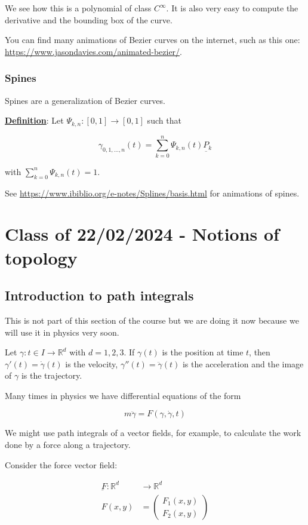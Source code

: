 \documentclass[10pt]{extarticle}
\newcommand{\R}{\mathbb{R}}
\newcommand{\munderbar}[1]{\underbar{\ensuremath{#1}}}
\begin{document}
We see how this is a polynomial of class $C^\infty$. It is also very easy to compute the derivative and the bounding box of the curve.

You can find many animations of Bezier curves on the internet, such as this one: \url{https://www.jasondavies.com/animated-bezier/}.

\subsubsection{Spines}

Spines are a generalization of Bezier curves.

\textbf{\underline{Definition}}: Let $\Psi_{k, n}: [0, 1]\to [0, 1]$ such that

$$
    \gamma_{0,1, \ldots, n}(t) = \sum_{k=0}^n \Psi_{k, n}(t) \munderbar{P_k}
$$

with $\sum_{k=0}^n \Psi_{k, n}(t) = 1$.

See \url{https://www.ibiblio.org/e-notes/Splines/basis.html} for animations of spines.

\section{Class of 22/02/2024 - Notions of topology}


\subsection{Introduction to path integrals}

This is not part of this section of the course but we are doing it now because we will use it in physics very soon.

Let $\gamma: t \in I \to \R^d$ with $d = 1, 2, 3$.
If $\gamma(t)$ is the position at time $t$, then $\gamma'(t) = \dot{\gamma}(t)$ is the velocity, $\gamma''(t) = \ddot{\gamma}(t)$ is the acceleration and the image of $\gamma$ is the trajectory.

Many times in physics we have differential equations of the form

$$
    m \ddot{\gamma} = F(\gamma, \dot{\gamma}, t)
$$

We might use path integrals of a vector fields, for example, to calculate the work done by a force along a trajectory.

Consider the force vector field:

\begin{align*}
    \munderbar{F}: \R^d & \to \R^d                \\
    F(x,y)              & = \begin{pmatrix}
                                F_1(x, y) \\ F_2(x, y)
                            \end{pmatrix}
\end{align*}
\end{document}
